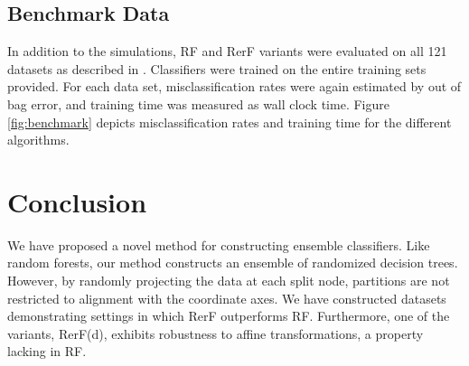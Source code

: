 \documentclass{article} %
\begin{document}

\subsection{Benchmark Data}

In addition to the simulations, RF and RerF variants were evaluated on all 121 datasets as described in \cite{Delgado14}. Classifiers were trained on the entire training sets provided. For each data set, misclassification rates were again estimated by out of bag error, and training time was measured as wall clock time.  Figure \ref{fig:benchmark} depicts misclassification rates and training time for the different algorithms.  


\section{Conclusion}

We have proposed a novel method for constructing ensemble classifiers. Like random forests, our method constructs an ensemble of randomized decision trees. However, by randomly projecting the data at each split node, partitions are not restricted to alignment with the coordinate axes. We have constructed datasets demonstrating settings in which RerF outperforms RF. Furthermore, one of the variants, RerF(d), exhibits robustness to affine transformations, a property lacking in RF.
\end{document}
